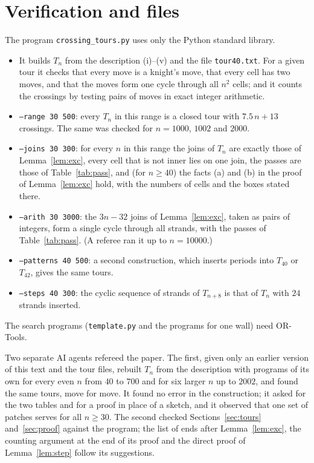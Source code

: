 \documentclass[11pt]{amsart}
\theoremstyle{remark}
\begin{document}
\section{Verification and files}\label{sec:files}
The program \texttt{crossing\_tours.py} uses only the Python standard library.
\begin{itemize}
\item It builds $T_n$ from the description (i)--(v) and the file \texttt{tour40.txt}. For a given tour it checks
that every move is a knight's move, that every cell has two moves, and that the moves form one cycle through all
$n^2$ cells; and it counts the crossings by testing pairs of moves in exact integer arithmetic.
\item \texttt{--range 30 500}: every $T_n$ in this range is a closed tour with $7.5\,n+13$ crossings. The same was
checked for $n=1000$, $1002$ and $2000$.
\item \texttt{--joins 30 300}: for every $n$ in this range the joins of $T_n$ are exactly those of
Lemma~\ref{lem:exc}, every cell that is not inner lies on one join, the passes are those of Table~\ref{tab:pass}, and
(for $n\ge40$) the facts (a) and (b) in the proof of Lemma~\ref{lem:exc} hold, with the numbers of cells and the boxes
stated there.
\item \texttt{--arith 30 3000}: the $3n-32$ joins of Lemma~\ref{lem:exc}, taken as pairs of integers, form a single cycle
through all strands, with the passes of Table~\ref{tab:pass}. (A referee ran it up to $n=10000$.)
\item \texttt{--patterns 40 500}: a second construction, which inserts periods into $T_{40}$ or $T_{42}$, gives
the same tours.
\item \texttt{--steps 40 300}: the cyclic sequence of strands of $T_{n+8}$ is that of $T_n$ with $24$ strands
inserted.
\end{itemize}
The search programs (\texttt{template.py} and the programs for one wall) need OR-Tools.

Two separate AI agents refereed the paper. The first, given only an earlier version of this text and the tour files,
rebuilt $T_n$ from the description with programs of its own for every even $n$ from $40$ to $700$ and for six larger $n$
up to $2002$, and found the same tours, move for move. It found no error in the construction; it asked for the two tables
and for a proof in place of a sketch, and it observed that one set of patches serves for all $n\ge30$. The second checked
Sections~\ref{sec:tours} and~\ref{sec:proof} against the program; the list of ends after Lemma~\ref{lem:exc}, the counting
argument at the end of its proof and the direct proof of Lemma~\ref{lem:step} follow its suggestions.
\end{document}
